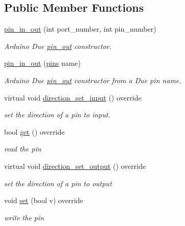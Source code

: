 \subsection*{Public Member Functions}
\begin{DoxyCompactItemize}
\item 
\hyperlink{classdue_1_1pin__in__out_a12f008036b3594228749c70f45cbdf9a}{pin\+\_\+in\+\_\+out} (int port\+\_\+number, int pin\+\_\+number)
\begin{DoxyCompactList}\small\item\em Arduino Due \hyperlink{classdue_1_1pin__out}{pin\+\_\+out} constructor. \end{DoxyCompactList}\item 
\hyperlink{classdue_1_1pin__in__out_a228da28eb609b180235db2a0ed249469}{pin\+\_\+in\+\_\+out} (\hyperlink{namespacedue_a8ffa3ec309934ff9db34317e504bcc92}{pins} name)
\begin{DoxyCompactList}\small\item\em Arduino Due \hyperlink{classdue_1_1pin__out}{pin\+\_\+out} constructor from a Due pin name. \end{DoxyCompactList}\item 
virtual void \hyperlink{classdue_1_1pin__in__out_a7b45bd8f6f03de4176727ff97c0da7d2}{direction\+\_\+set\+\_\+input} () override
\begin{DoxyCompactList}\small\item\em set the direction of a pin to input. \end{DoxyCompactList}\item 
bool \hyperlink{classdue_1_1pin__in__out_a09142f62d25f903475be52da0b3fe8a9}{get} () override
\begin{DoxyCompactList}\small\item\em read the pin \end{DoxyCompactList}\item 
virtual void \hyperlink{classdue_1_1pin__in__out_a9b77a85073f07e552871d4d67577d4a0}{direction\+\_\+set\+\_\+output} () override
\begin{DoxyCompactList}\small\item\em set the direction of a pin to output \end{DoxyCompactList}\item 
void \hyperlink{classdue_1_1pin__in__out_ad3a74cb13af59d4a5be3cc40a8f894b8}{set} (bool v) override
\begin{DoxyCompactList}\small\item\em write the pin \end{DoxyCompactList}\end{DoxyCompactItemize}


